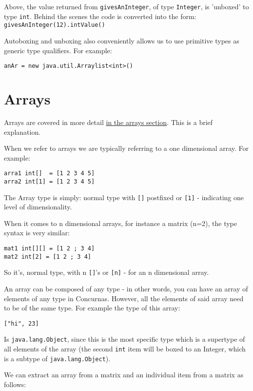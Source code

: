\documentclass[conc-doc]{subfiles}
\begin{document}
Above, the value returned from \lstinline{givesAnInteger}, of type \lstinline{Integer}, is 'unboxed' to type \lstinline{int}. Behind the scenes the code is converted into the form: \lstinline{givesAnInteger(12).intValue()}

Autoboxing and unboxing also conveniently allows us to use primitive types as generic type qualifiers. For example:
\begin{lstlisting}
anAr = new java.util.Arraylist<int>()
\end{lstlisting}

\section{Arrays}
Arrays are covered in more detail \hyperref[ch:arrays]{in the arrays section}. This is a brief explanation.

When we refer to arrays we are typically referring to a one dimensional array. For example:

\begin{lstlisting}
arra1 int[]  = [1 2 3 4 5]
arra2 int[1] = [1 2 3 4 5]
\end{lstlisting}

The Array type is simply: normal type with \lstinline{[]} postfixed or \lstinline{[1]} - indicating one level of dimensionality.

When it comes to n dimensional arrays, for instance a matrix (n=2), the type syntax is very similar: 
\begin{lstlisting}
mat1 int[][] = [1 2 ; 3 4]
mat2 int[2] = [1 2 ; 3 4]
\end{lstlisting}

So it's, normal type, with n \lstinline{[]}'s or \lstinline{[n]} - for an n dimensional array.

An array can be composed of any type - in other words, you can have an array of elements of any type in Concurnas. However, all the elements of said array need to be of the same type. For example the type of this array:

\begin{lstlisting}
["hi", 23]
\end{lstlisting}

Is \lstinline{java.lang.Object}, since this is the most specific type which is a supertype of all elements of the array (the second \lstinline{int} item will be boxed to an Integer, which is a subtype of \lstinline{java.lang.Object}).

We can extract an array from a matrix and an individual item from a matrix as follows:
\end{document}
